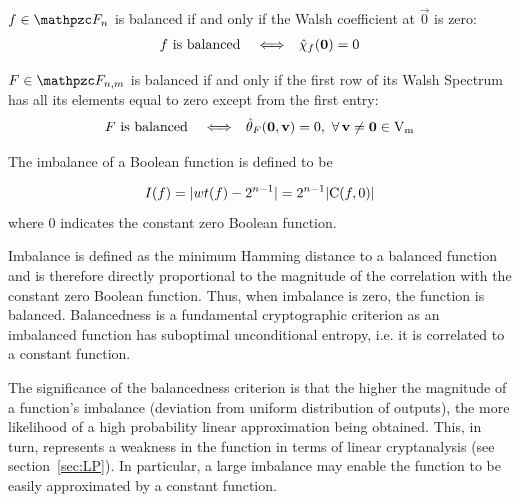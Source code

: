 \begin{theorem}
\cite{Pommerening:05} $f \in \funct{F}_n$ is balanced if and only if the Walsh coefficient at $\vec{0}$ is zero:
\begin{equation}
\begin{array}{rcl}
    f \mbox{ is balanced } &\Longleftrightarrow& \walsh{\chi}_f(\vec{0})= 0
\end{array}
\end{equation}
\end{theorem}

\begin{theorem}
\cite{Pommerening:05} $F \in \funct{F}_{n,m}$ is balanced if and only if the first row of its Walsh Spectrum has all its elements equal to zero except from the first entry:
\begin{equation}
\begin{array}{rcl}
    F \mbox{ is balanced } &\Longleftrightarrow& \walsh{\theta}_F(\vec{0},\vec{v})= 0,  \ \fa \vec{v} \neq \vec{0} \in \gf{V_m} 
\end{array}
\end{equation}
\end{theorem}

\begin{definition}\label{def:Imbalance}
The imbalance of a Boolean function is defined to be

\begin{equation}
\crit{I}(f)= | wt(f)-2^{n-1} | = 2^{n-1} | \Cor(f,0)  |
\end{equation}
where $0$ indicates the constant zero Boolean function.
\end{definition}

Imbalance is defined as the minimum Hamming distance to a balanced function and is therefore directly proportional to the magnitude of the correlation with the constant zero Boolean function. Thus, when imbalance is zero, the function is balanced. Balancedness is a fundamental cryptographic criterion as an imbalanced function has suboptimal unconditional entropy, i.e. it is correlated to a constant function.

The significance of the balancedness criterion is that the higher the magnitude of a function's imbalance (deviation from uniform distribution of outputs), the more likelihood of a high probability linear approximation being obtained. This, in turn, represents a weakness in the function in terms of linear cryptanalysis (see section~\ref{sec:LP}). In particular, a large imbalance may enable the function to be easily approximated by a constant function.

